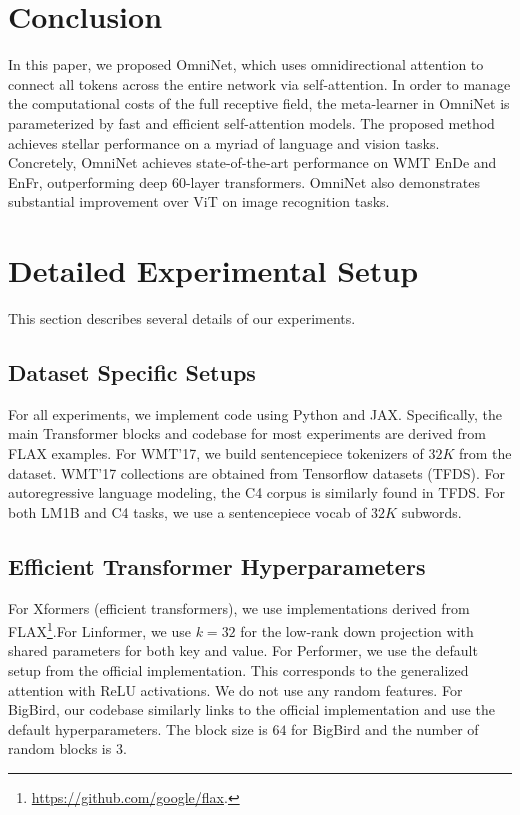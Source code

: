 \documentclass{article}
\begin{document}
\section{Conclusion}
\vspace{-1pt}
In this paper, we proposed OmniNet, which uses omnidirectional attention to connect all tokens across the entire network via self-attention. In order to manage the computational costs of the full receptive field, the meta-learner in OmniNet is parameterized by fast and efficient self-attention models. The proposed method achieves stellar performance on a myriad of language and vision tasks. Concretely, OmniNet achieves state-of-the-art performance on WMT EnDe and EnFr, outperforming deep 60-layer transformers. OmniNet also demonstrates substantial improvement over ViT on image recognition tasks. 





\newpage
\appendix
\section{Detailed Experimental Setup}
This section describes several details of our experiments.
\subsection{Dataset Specific Setups}
For all experiments, we implement code using Python and JAX. Specifically, the main Transformer blocks and codebase for most experiments are derived from FLAX examples. For WMT'17, we build sentencepiece tokenizers of $32K$ from the dataset. WMT'17 collections are obtained from Tensorflow datasets (TFDS). For autoregressive language modeling, the C4 corpus is similarly found in TFDS. For both LM1B and C4 tasks, we use a sentencepiece vocab of $32K$ subwords.

\subsection{Efficient Transformer Hyperparameters} For Xformers (efficient transformers), we use implementations derived from FLAX\footnote{\url{https://github.com/google/flax}.}.For Linformer, we use $k=32$ for the low-rank down projection with shared parameters for both key and value. For Performer, we use the default setup from the official implementation. This corresponds to the generalized attention with ReLU activations. We do not use any random features. For BigBird, our codebase similarly links to the official implementation and use the default hyperparameters. The block size is $64$ for BigBird and the number of random blocks is $3$.
\end{document}
